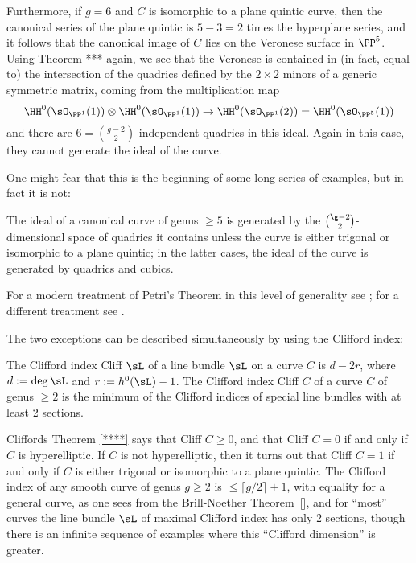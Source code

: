 Furthermore, if $g = 6$ and $C$ is isomorphic to a plane quintic curve, then the canonical series of the plane quintic is $5-3 = 2$ times the hyperplane series, and it follows that the canonical image of $C$ lies on the Veronese surface in $\PP^{5}$. Using Theorem *** again, we see that the Veronese is contained in (in fact, equal to) the intersection of the quadrics defined by the $2\times 2$ minors of a generic symmetric matrix, coming from the 
multiplication map 
$$
\HH^{0}(\sO_{\PP^{1}}(1))\otimes \HH^{0}(\sO_{\PP^{1}}(1)) \to \HH^{0}(\sO_{\PP^{1}}(2)) = \HH^{0}(\sO_{\PP^{5}}(1))
$$
and there are $6 = {g-2\choose 2}$ independent quadrics in this ideal. Again in this case, they cannot generate the ideal of the curve.

One might fear that this is the beginning of some long series of examples, but in fact it is not: 

\begin{theorem} [Petri]
The ideal of a canonical curve of genus $\geq 5$ is generated by the $\g-2\choose 2$-dimensional space of quadrics it contains unless the curve is either trigonal or isomorphic to a plane quintic; in the latter cases, the ideal of the curve is generated by quadrics and cubics.
\end{theorem}

For a modern treatment of Petri's Theorem in this level of generality see \cite{Schreyer}; for a different treatment see \cite{Arbarello-Sernesi}.

The two exceptions can be described simultaneously by using the Clifford index:

\begin{definition}
 The Clifford index Cliff $\sL$ of a line bundle $\sL$ on a curve $C$ is $d-2r$, where $d := \deg \sL$ and $r :=  h^0(\sL)-1$. The Clifford index Cliff $C$ of
 a curve $C$ of genus $\geq 2$ is the minimum of the Clifford indices of special line bundles with at least 2 sections.
\end{definition}

Cliffords Theorem \ref{****} says that Cliff $C \geq 0$, and that Cliff $C = 0$ if and only if $C$ is hyperelliptic. If $C$ is not hyperelliptic, then it turns out that Cliff $C=1$ if and only if $C$ is either trigonal or isomorphic to a plane quintic. The Clifford index of any smooth curve of genus $g\geq 2$ is $\leq \lceil g/2\rceil+1$, with equality for a general curve, as one sees from the Brill-Noether Theorem~\ref{}, and for ``most'' curves the line bundle $\sL$ of maximal Clifford index has only 2 sections, though there is an infinite sequence of examples where this
``Clifford dimension'' is greater.

